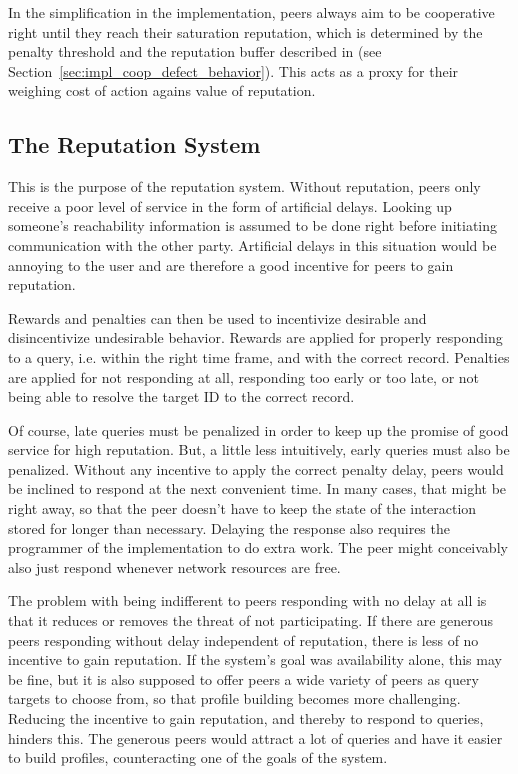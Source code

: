 In the simplification in the implementation, peers always aim to be cooperative
right until they reach their saturation reputation, which is determined by the
penalty threshold and the reputation buffer described in (see
Section~\ref{sec:impl_coop_defect_behavior}). This acts as a proxy for their
weighing cost of action agains value of reputation.

\subsection{The Reputation System}
\label{sec:desc_rep_system}
This is the purpose of the reputation system. Without reputation, peers only
receive a poor level of service in the form of artificial delays. Looking up
someone's reachability information is assumed to be done right before initiating
communication with the other party. Artificial delays in this situation would be
annoying to the user and are therefore a good incentive for peers to gain
reputation.

Rewards and penalties can then be used to incentivize desirable and
disincentivize undesirable behavior. Rewards are applied for properly responding
to a query, i.e. within the right time frame, and with the correct record.
Penalties are applied for not responding at all, responding too early or too
late, or not being able to resolve the target ID to the correct record.

Of course, late queries must be penalized in order to keep up the promise
of good service for high reputation. But, a little less intuitively, early
queries must also be penalized. Without any incentive to apply the correct
penalty delay, peers would be inclined to respond at the next convenient time.
In many cases, that might be right away, so that the peer doesn't have to keep
the state of the interaction stored for longer than necessary. Delaying the
response also requires the programmer of the implementation to do extra work.
The peer might conceivably also just respond whenever network resources are
free.

The problem with being indifferent to peers responding with no delay at all is
that it reduces or removes the threat of not participating. If there are
generous peers responding without delay independent of reputation, there is less
of no incentive to gain reputation. If the system's goal was availability alone,
this may be fine, but it is also supposed to offer peers a wide variety of peers
as query targets to choose from, so that profile building becomes more
challenging. Reducing the incentive to gain reputation, and thereby to respond
to queries, hinders this. The generous peers would attract a lot of queries and
have it easier to build profiles, counteracting one of the goals of the system.

